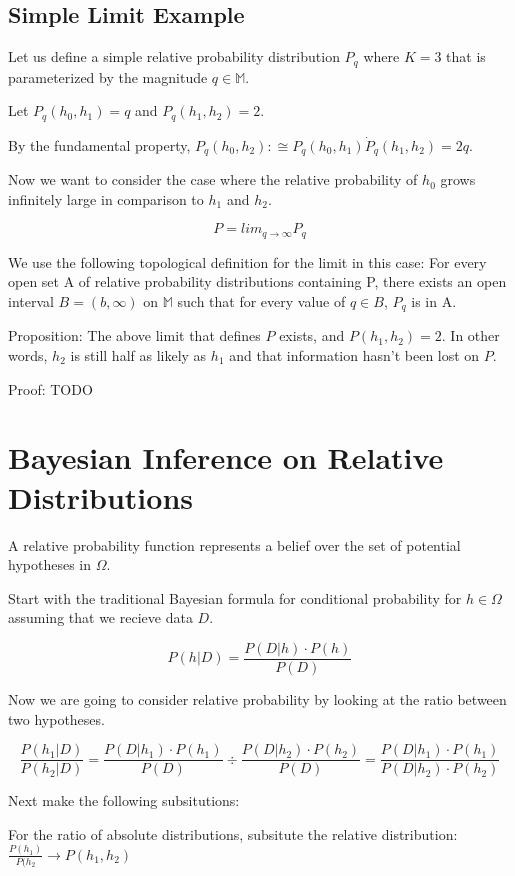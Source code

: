 \documentclass[twoside]{article}
\begin{document}
\subsection{Simple Limit Example}

Let us define a simple relative probability distribution \(P_q\) where \(K = 3\) that is parameterized by the magnitude \(q \in \mathbb{M}\).

Let \(P_q(h_0, h_1) = q\) and \(P_q(h_1, h_2) = 2\).

By the fundamental property, \(P_q(h_0, h_2) :\cong P_q(h_0, h_1) \dot P_q(h_1, h_2) = 2q\).

Now we want to consider the case where the relative probability of \(h_0\) grows infinitely large in comparison to \(h_1\) and \(h_2\).

\[P = lim_{q \rightarrow \infty} P_q\]

We use the following topological definition for the limit in this case: For every open set A of relative probability distributions containing P, there exists an open interval \(B=(b, \infty)\) on \(\mathbb{M}\) such that for every value of \(q \in B\), \(P_q\) is in A.

Proposition: The above limit that defines \(P\) exists, and \(P(h_1, h_2) = 2\). In other words, \(h_2\) is still half as likely as \(h_1\) and that information hasn't been lost on \(P\).

Proof: TODO

\section{Bayesian Inference on Relative Distributions}

A relative probability function represents a belief over the set of potential hypotheses in \(\Omega\).

Start with the traditional Bayesian formula for conditional probability for \(h \in \Omega\) assuming that we recieve data \(D\).

\[P(h|D) = \frac{P(D|h) \cdot P(h)}{P(D)}\]

Now we are going to consider relative probability by looking at the ratio between two hypotheses.

\[\frac{P(h_1|D)}{P(h_2| D)} = \frac{P(D|h_1) \cdot P(h_1)}{P(D)} \div \frac{P(D|h_2) \cdot P(h_2)}{P(D)} = \frac{P(D|h_1) \cdot P(h_1)}{P(D|h_2) \cdot P(h_2)} \]

Next make the following subsitutions:

For the ratio of absolute distributions, subsitute the relative distribution: \(\frac{P(h_1)}{P(h_2} \rightarrow P(h_1, h_2) \)
\end{document}
